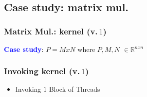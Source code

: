 \subsection{Case study: matrix mul.}
\begin{frame}
	\frametitle{Matrix Mul.: kernel (v.\,$1$)}
	\textbf{\textcolor{blue}{Case study}}: $P=MxN$ where $P,M,N$ $\in \mathbb{R}^{nxn}$
	
\end{frame}

\begin{frame}
	\frametitle{Invoking kernel (v.\,$1$)}
	\begin{itemize}
		\item Invoking $1$ Block of Threads
        
        \end{itemize}			 
\end{frame}

